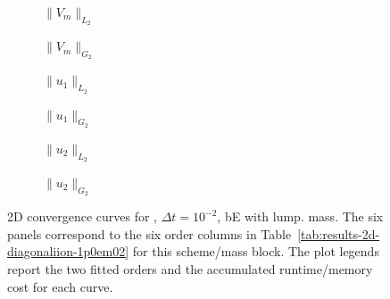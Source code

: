 \begin{figure}[p]
\centering
\begin{subfigure}{0.485\linewidth}
\centering
{}
\caption{$\|V_m\|_{L_2}$}
\label{fig:results-2d-diagonaliion-1p0em02-backwardeuler-lumped-a}
\end{subfigure}
\hfill
\begin{subfigure}{0.485\linewidth}
\centering
{}
\caption{$\|V_m\|_{G_2}$}
\label{fig:results-2d-diagonaliion-1p0em02-backwardeuler-lumped-b}
\end{subfigure}
\par\vspace{0.8em}
\begin{subfigure}{0.485\linewidth}
\centering
{}
\caption{$\|u_1\|_{L_2}$}
\label{fig:results-2d-diagonaliion-1p0em02-backwardeuler-lumped-c}
\end{subfigure}
\hfill
\begin{subfigure}{0.485\linewidth}
\centering
{}
\caption{$\|u_1\|_{G_2}$}
\label{fig:results-2d-diagonaliion-1p0em02-backwardeuler-lumped-d}
\end{subfigure}
\par\vspace{0.8em}
\begin{subfigure}{0.485\linewidth}
\centering
{}
\caption{$\|u_2\|_{L_2}$}
\label{fig:results-2d-diagonaliion-1p0em02-backwardeuler-lumped-e}
\end{subfigure}
\hfill
\begin{subfigure}{0.485\linewidth}
\centering
{}
\caption{$\|u_2\|_{G_2}$}
\label{fig:results-2d-diagonaliion-1p0em02-backwardeuler-lumped-f}
\end{subfigure}
\caption{2D convergence curves for , $\Delta t=10^{-2}$, bE with lump. mass. The six panels correspond to the six order columns in Table~\ref{tab:results-2d-diagonaliion-1p0em02} for this scheme/mass block. The plot legends report the two fitted orders and the accumulated runtime/memory cost for each curve.}
\label{fig:results-2d-diagonaliion-1p0em02-backwardeuler-lumped}
\end{figure}
\FloatBarrier

